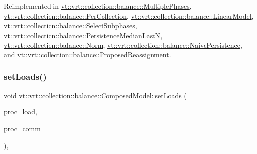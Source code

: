 Reimplemented in \hyperlink{structvt_1_1vrt_1_1collection_1_1balance_1_1_multiple_phases_aebe7b174623cffe8f4790e32e15859ff}{vt\+::vrt\+::collection\+::balance\+::\+Multiple\+Phases}, \hyperlink{structvt_1_1vrt_1_1collection_1_1balance_1_1_per_collection_abe527a6f5cd861eb21c251d7d6afad0f}{vt\+::vrt\+::collection\+::balance\+::\+Per\+Collection}, \hyperlink{structvt_1_1vrt_1_1collection_1_1balance_1_1_linear_model_a98bafaac5ddbf41d2589a8efeb3da37a}{vt\+::vrt\+::collection\+::balance\+::\+Linear\+Model}, \hyperlink{classvt_1_1vrt_1_1collection_1_1balance_1_1_select_subphases_a77cf76f7699c9480483cb4104bf58965}{vt\+::vrt\+::collection\+::balance\+::\+Select\+Subphases}, \hyperlink{structvt_1_1vrt_1_1collection_1_1balance_1_1_persistence_median_last_n_a905b84cb14c5326bdce4b761e4fd3106}{vt\+::vrt\+::collection\+::balance\+::\+Persistence\+Median\+LastN}, \hyperlink{classvt_1_1vrt_1_1collection_1_1balance_1_1_norm_ae703c9f02a514a1d7f130daea2367566}{vt\+::vrt\+::collection\+::balance\+::\+Norm}, \hyperlink{structvt_1_1vrt_1_1collection_1_1balance_1_1_naive_persistence_ac693e6aad2e2c11815e56b2530e9c97e}{vt\+::vrt\+::collection\+::balance\+::\+Naive\+Persistence}, and \hyperlink{structvt_1_1vrt_1_1collection_1_1balance_1_1_proposed_reassignment_ac865e7afd9b830328a31b947aed65f05}{vt\+::vrt\+::collection\+::balance\+::\+Proposed\+Reassignment}.

\mbox{\label{classvt_1_1vrt_1_1collection_1_1balance_1_1_composed_model_a3a7da5e81a933ea88f87a1226fd3b401}} 
\subsubsection{\texorpdfstring{set\+Loads()}{setLoads()}}
{\footnotesize\ttfamily void vt\+::vrt\+::collection\+::balance\+::\+Composed\+Model\+::set\+Loads (\begin{DoxyParamCaption}\item[{std\+::unordered\+\_\+map$<$ \hyperlink{namespacevt_a46ce6733d5cdbd735d561b7b4029f6d7}{Phase\+Type}, \hyperlink{namespacevt_1_1vrt_1_1collection_1_1balance_a5339303db2e1ce964d783a53fd74e6b1}{Load\+Map\+Type} $>$ const $\ast$}]{proc\+\_\+load,  }\item[{std\+::unordered\+\_\+map$<$ \hyperlink{namespacevt_a46ce6733d5cdbd735d561b7b4029f6d7}{Phase\+Type}, \hyperlink{namespacevt_1_1vrt_1_1collection_1_1balance_a01ee1fb0ae2da1d2ab7fdca3be9ae351}{Comm\+Map\+Type} $>$ const $\ast$}]{proc\+\_\+comm }\end{DoxyParamCaption})\hspace{0.3cm}{\ttfamily [override]}, {\ttfamily [virtual]}}



